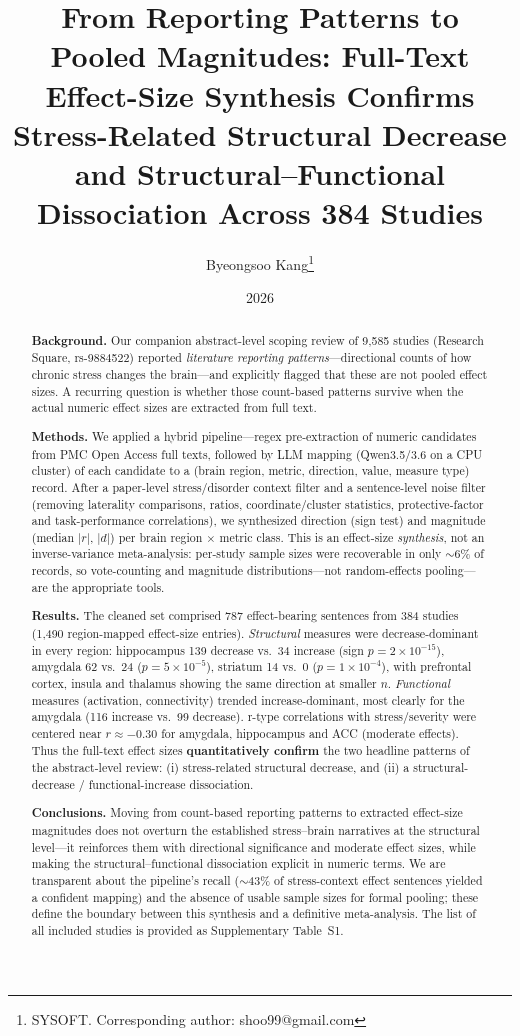 \documentclass[11pt]{article}
\title{From Reporting Patterns to Pooled Magnitudes: Full-Text Effect-Size
Synthesis Confirms Stress-Related Structural Decrease and
Structural--Functional Dissociation Across 384 Studies}
\author{Byeongsoo Kang\thanks{SYSOFT. Corresponding author: shoo99@gmail.com}}
\date{2026}
\begin{document}
\maketitle

\begin{abstract}
\textbf{Background.} Our companion abstract-level scoping review of 9{,}585
studies (Research Square, rs-9884522) reported \emph{literature reporting
patterns}---directional counts of how chronic stress changes the brain---and
explicitly flagged that these are not pooled effect sizes. A recurring question
is whether those count-based patterns survive when the actual numeric effect
sizes are extracted from full text.

\textbf{Methods.} We applied a hybrid pipeline---regex pre-extraction of
numeric candidates from PMC Open Access full texts, followed by LLM mapping
(Qwen3.5/3.6 on a CPU cluster) of each candidate to a (brain region, metric,
direction, value, measure type) record. After a paper-level stress/disorder
context filter and a sentence-level noise filter (removing laterality
comparisons, ratios, coordinate/cluster statistics, protective-factor and
task-performance correlations), we synthesized direction (sign test) and
magnitude (median $|r|$, $|d|$) per brain region $\times$ metric class. This is
an effect-size \emph{synthesis}, not an inverse-variance meta-analysis: per-study
sample sizes were recoverable in only $\sim$6\% of records, so vote-counting and
magnitude distributions---not random-effects pooling---are the appropriate tools.

\textbf{Results.} The cleaned set comprised 787 effect-bearing sentences from 384
studies (1{,}490 region-mapped effect-size entries). \emph{Structural} measures
were decrease-dominant in every region: hippocampus 139 decrease vs.\ 34 increase
(sign $p=2\times10^{-15}$), amygdala 62 vs.\ 24 ($p=5\times10^{-5}$), striatum 14
vs.\ 0 ($p=1\times10^{-4}$), with prefrontal cortex, insula and thalamus showing
the same direction at smaller $n$. \emph{Functional} measures (activation,
connectivity) trended increase-dominant, most clearly for the amygdala (116
increase vs.\ 99 decrease). r-type correlations with stress/severity were
centered near $r\approx-0.30$ for amygdala, hippocampus and ACC (moderate
effects). Thus the full-text effect sizes \textbf{quantitatively confirm} the two
headline patterns of the abstract-level review: (i) stress-related structural
decrease, and (ii) a structural-decrease / functional-increase dissociation.

\textbf{Conclusions.} Moving from count-based reporting patterns to extracted
effect-size magnitudes does not overturn the established stress--brain
narratives at the structural level---it reinforces them with directional
significance and moderate effect sizes, while making the structural--functional
dissociation explicit in numeric terms. We are transparent about the pipeline's
recall ($\sim$43\% of stress-context effect sentences yielded a confident
mapping) and the absence of usable sample sizes for formal pooling; these define
the boundary between this synthesis and a definitive meta-analysis. The list of
all included studies is provided as Supplementary Table~S1.
\end{abstract}
\end{document}
